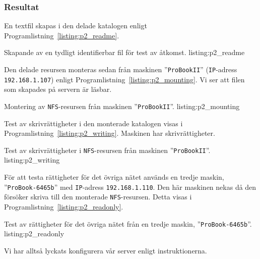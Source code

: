 \subsubsection{Resultat}

En textfil skapas i den delade katalogen enligt 
Programlistning~\ref{listing:p2_readme}.

            {Skapande av en tydligt identifierbar fil för test av åtkomst.}
            {listing:p2_readme}

Den delade resursen monteras sedan från maskinen ''\texttt{ProBookII}''
(\texttt{IP}-adress \texttt{192.168.1.107}) enligt
Programlistning~\ref{listing:p2_mounting}.
Vi ser att filen som skapades på servern är läsbar.

            {Montering av \texttt{NFS}-resursen från maskinen
             ''\texttt{ProBookII}''.}
            {listing:p2_mounting}

Test av skrivrättigheter i den monterade katalogen visas i
Programlistning~\ref{listing:p2_writing}. Maskinen har skrivrättigheter.

            {Test av skrivrättigheter i \texttt{NFS}-resursen från maskinen
             ''\texttt{ProBookII}''.}
            {listing:p2_writing}

För att testa rättigheter för det övriga nätet används en tredje maskin,
''\texttt{ProBook-6465b}'' med \texttt{IP}-adress \texttt{192.168.1.110}.  
Den här maskinen nekas då den försöker skriva till den monterade
\texttt{NFS}-resursen.  
Detta visas i Programlistning~\ref{listing:p2_readonly}.

            {Test av rättigheter för det övriga nätet från en tredje maskin,
             ''\texttt{ProBook-6465b}''.}
            {listing:p2_readonly}


Vi har alltså lyckats konfigurera vår server enligt instruktionerna.
